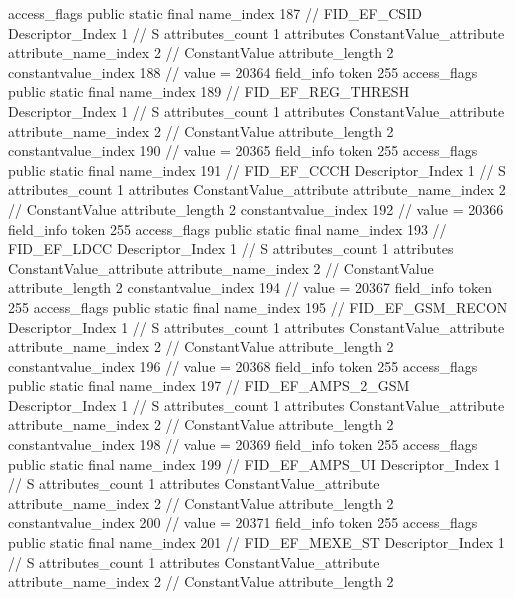{{{{{				access_flags	public static final
				name_index	187		// FID_EF_CSID
				Descriptor_Index	1		// S
				attributes_count	1
				attributes {
				ConstantValue_attribute {
					attribute_name_index	2		// ConstantValue
					attribute_length	2
					constantvalue_index	188		// value = 20364
				}
				}
			}
			field_info {
				token	255
				access_flags	public static final
				name_index	189		// FID_EF_REG_THRESH
				Descriptor_Index	1		// S
				attributes_count	1
				attributes {
				ConstantValue_attribute {
					attribute_name_index	2		// ConstantValue
					attribute_length	2
					constantvalue_index	190		// value = 20365
				}
				}
			}
			field_info {
				token	255
				access_flags	public static final
				name_index	191		// FID_EF_CCCH
				Descriptor_Index	1		// S
				attributes_count	1
				attributes {
				ConstantValue_attribute {
					attribute_name_index	2		// ConstantValue
					attribute_length	2
					constantvalue_index	192		// value = 20366
				}
				}
			}
			field_info {
				token	255
				access_flags	public static final
				name_index	193		// FID_EF_LDCC
				Descriptor_Index	1		// S
				attributes_count	1
				attributes {
				ConstantValue_attribute {
					attribute_name_index	2		// ConstantValue
					attribute_length	2
					constantvalue_index	194		// value = 20367
				}
				}
			}
			field_info {
				token	255
				access_flags	public static final
				name_index	195		// FID_EF_GSM_RECON
				Descriptor_Index	1		// S
				attributes_count	1
				attributes {
				ConstantValue_attribute {
					attribute_name_index	2		// ConstantValue
					attribute_length	2
					constantvalue_index	196		// value = 20368
				}
				}
			}
			field_info {
				token	255
				access_flags	public static final
				name_index	197		// FID_EF_AMPS_2_GSM
				Descriptor_Index	1		// S
				attributes_count	1
				attributes {
				ConstantValue_attribute {
					attribute_name_index	2		// ConstantValue
					attribute_length	2
					constantvalue_index	198		// value = 20369
				}
				}
			}
			field_info {
				token	255
				access_flags	public static final
				name_index	199		// FID_EF_AMPS_UI
				Descriptor_Index	1		// S
				attributes_count	1
				attributes {
				ConstantValue_attribute {
					attribute_name_index	2		// ConstantValue
					attribute_length	2
					constantvalue_index	200		// value = 20371
				}
				}
			}
			field_info {
				token	255
				access_flags	public static final
				name_index	201		// FID_EF_MEXE_ST
				Descriptor_Index	1		// S
				attributes_count	1
				attributes {
				ConstantValue_attribute {
					attribute_name_index	2		// ConstantValue
					attribute_length	2
}}}}}}}
